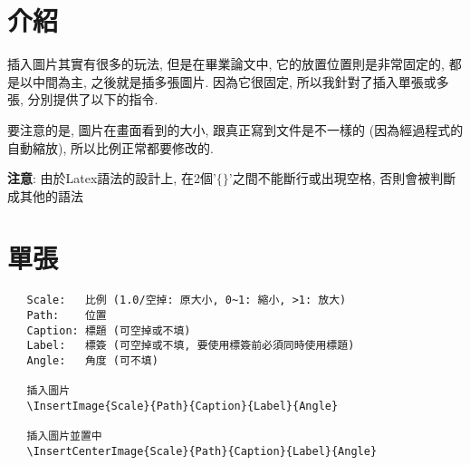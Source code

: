 \section{介紹}

插入圖片其實有很多的玩法, 但是在畢業論文中, 它的放置位置則是非常固定的, 都是以中間為主, 之後就是插多張圖片. 因為它很固定, 所以我針對了插入單張或多張, 分別提供了以下的指令.

要注意的是, 圖片在畫面看到的大小, 跟真正寫到文件是不一樣的 (因為經過程式的自動縮放), 所以比例正常都要修改的.

\textbf{注意}: 由於Latex語法的設計上, 在2個'$\lbrace\rbrace$'之間不能斷行或出現空格, 否則會被判斷成其他的語法

\newpage
\section{單張}

  \begin{framed}
  \begin{verbatim}
   Scale:   比例 (1.0/空掉: 原大小, 0~1: 縮小, >1: 放大)
   Path:    位置
   Caption: 標題 (可空掉或不填)
   Label:   標簽 (可空掉或不填, 要使用標簽前必須同時使用標題)
   Angle:   角度 (可不填)

   插入圖片
   \InsertImage{Scale}{Path}{Caption}{Label}{Angle}

   插入圖片並置中
   \InsertCenterImage{Scale}{Path}{Caption}{Label}{Angle}
  \end{verbatim}
  \end{framed}

  \newpage

